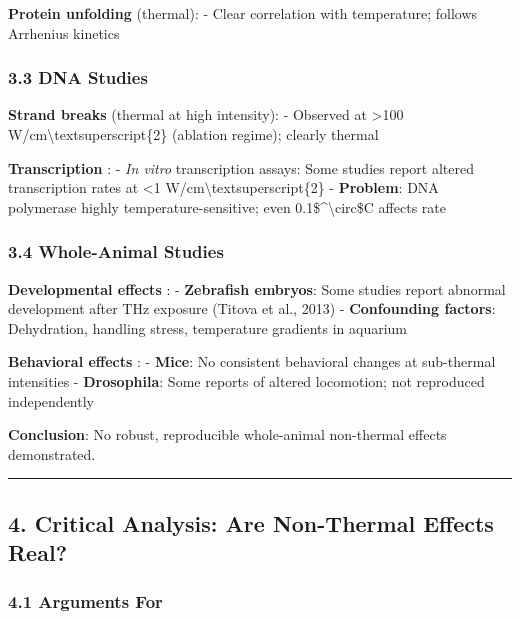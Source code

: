 \textbf{Protein unfolding} (thermal): - Clear correlation with
temperature; follows Arrhenius kinetics

\subsubsection{3.3 DNA Studies}\label{dna-studies}

\textbf{Strand breaks} (thermal at high intensity): - Observed at
\textgreater100 W/cm\textbackslash textsuperscript\{2\} (ablation
regime); clearly thermal

\textbf{Transcription} : - \emph{In vitro} transcription assays: Some
studies report altered transcription rates at \textless1
W/cm\textbackslash textsuperscript\{2\} - \textbf{Problem}: DNA
polymerase highly temperature-sensitive; even
0.1\$\^{}\textbackslash circ\$C affects rate

\subsubsection{3.4 Whole-Animal Studies}\label{whole-animal-studies}

\textbf{Developmental effects} : - \textbf{Zebrafish embryos}: Some
studies report abnormal development after THz exposure (Titova et al.,
2013) - \textbf{Confounding factors}: Dehydration, handling stress,
temperature gradients in aquarium

\textbf{Behavioral effects} : - \textbf{Mice}: No consistent behavioral
changes at sub-thermal intensities - \textbf{Drosophila}: Some reports
of altered locomotion; not reproduced independently

\textbf{Conclusion}: No robust, reproducible whole-animal non-thermal
effects demonstrated.

\begin{center}\rule{0.5\linewidth}{0.5pt}\end{center}

\subsection{4. Critical Analysis: Are Non-Thermal Effects
Real?}\label{critical-analysis-are-non-thermal-effects-real}

\subsubsection{\texorpdfstring{4.1 Arguments For
}{4.1 Arguments For }}\label{arguments-for}

